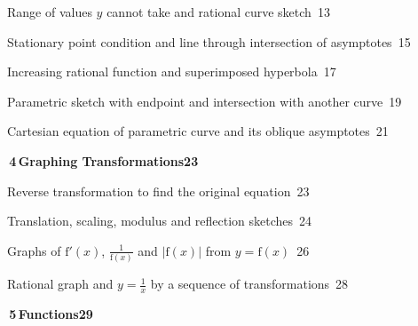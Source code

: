 \documentclass[a4paper,openany]{book}
\begin{document}
{\noindent{}\quad Range of values $y$ cannot take and rational curve sketch\dotfill\ 13\par
\noindent{}\quad Stationary point condition and line through intersection of asymptotes\dotfill\ 15\par
\noindent{}\quad Increasing rational function and superimposed hyperbola\dotfill\ 17\par
\noindent{}\quad Parametric sketch with endpoint and intersection with another curve\dotfill\ 19\par
\noindent{}\quad Cartesian equation of parametric curve and its oblique asymptotes\dotfill\ 21\par
\medskip\noindent\colorbox{blue!8}{\parbox{\dimexpr\textwidth-2\fboxsep}{\large\bfseries\color{blue!50!black}\colorbox{blue!50!black}{\color{white}\,4\,}\quad Graphing Transformations\hfill 23}}\par\nopagebreak\smallskip\nopagebreak
\noindent{}\quad Reverse transformation to find the original equation\dotfill\ 23\par
\noindent{}\quad Translation, scaling, modulus and reflection sketches\dotfill\ 24\par
\noindent{}\quad Graphs of $\mathrm {f}'(x)$, $\frac {1}{\mathrm {f}(x)}$ and $|\mathrm {f}(x)|$ from $y=\mathrm {f}(x)$\dotfill\ 26\par
\noindent{}\quad Rational graph and $y=\frac 1x$ by a sequence of transformations\dotfill\ 28\par
\medskip\noindent\colorbox{blue!8}{\parbox{\dimexpr\textwidth-2\fboxsep}{\large\bfseries\color{blue!50!black}\colorbox{blue!50!black}{\color{white}\,5\,}\quad Functions\hfill 29}}\par\nopagebreak\smallskip\nopagebreak
}
\end{document}
